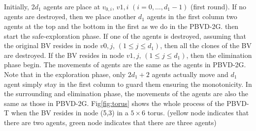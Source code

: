 Initially, 2$d_1$ agents are place at $v_{0,i}$, $v{1,i}$ $(i=0,\ldots,d_1-1)$ (first round). If no agents are destroyed, then we place another $d_1$ agents in the first column two agents at the top and the bottom in the first as we do in the PBVD-2G. then start the safe-exploration phase. If one of the agents is destroyed, assuming that the original BV resides in node $v{0,j}$, $(1\leq j\leq d_1)$, then all the clones of the BV are destroyed. If the BV resides in node $v{1,j}$, $(1\leq j\leq d_1)$, then the elimination phase begin. The movements of agents are the same as the agents in PBVD-2G. Note that in the exploration phase, only $2d_1+2$ agents actually move and $d_1$ agent simply stay in the first column to guard them ensuring the  monotonicity. In the surrounding and elimination phase, the movements of the agents are also the same as those in PBVD-2G. Fig\ref{fig:torus} shows the whole process of the PBVD-T when the BV resides in node (5,3) in a $5\times6$ torus. (yellow node indicates that there are two agents, green node indicates that there are three agents)      


